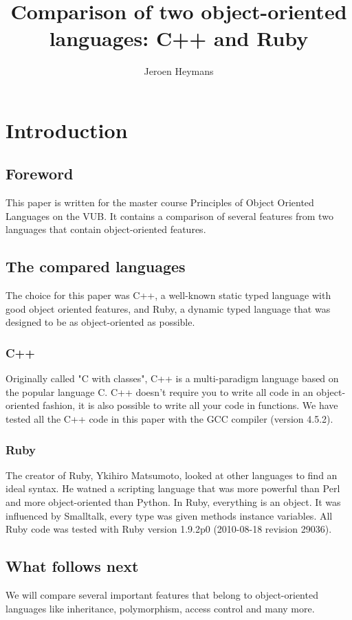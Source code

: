 \documentclass[10pt,a4paper,twocolumn]{article}
\author{Jeroen Heymans}
\title{Comparison of two object-oriented languages: C++ and Ruby}
\begin{document}
\maketitle

\tableofcontents

\columnbreak

\section{Introduction}

\subsection{Foreword}
This paper is written for the master course Principles of Object Oriented Languages on the VUB. It contains a comparison of several features from two languages that contain object-oriented features. 

\subsection{The compared languages}
The choice for this paper was C++, a well-known static typed language with good object oriented features, and Ruby, a dynamic typed language that was designed to be as object-oriented as possible.

\subsubsection{C++}
Originally called "C with classes", C++ is a multi-paradigm language based on the popular language C. C++ doesn't require you to write all code in an object-oriented fashion, it is also possible to write all your code in functions. We have tested all the C++ code in this paper with the GCC compiler (version 4.5.2).

\subsubsection{Ruby}
The creator of Ruby, Ykihiro Matsumoto, looked at other languages to find an ideal syntax. He watned a scripting language that was more powerful than Perl and more object-oriented than Python. In Ruby, everything is an object. It was influenced by Smalltalk, every type was given methods instance variables. All Ruby code was tested with Ruby version 1.9.2p0 (2010-08-18 revision 29036).

\subsection{What follows next}
We will compare several important features that belong to object-oriented languages like inheritance, polymorphism, access control and many more.
\end{document}
